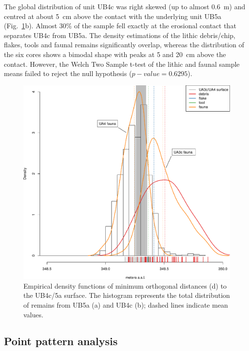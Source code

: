 \documentclass[preprint,authoryear,times]{elsarticle} %
\begin{document}
The global distribution of unit UB4c was right skewed (up to almost 0.6~m) and centred at about 5~cm above the contact with the underlying unit UB5a (Fig.~\ref{fig:8}b). Almost 30\% of the sample fell exactly at the erosional contact that separates UB4c from UB5a. The density estimations of the lithic debris/chip, flakes, tools and faunal remains significantly overlap, whereas the distribution of the six cores shows a bimodal shape with peaks at 5 and 20~cm above the contact. However, the Welch Two Sample t-test of the lithic and faunal sample means failed to reject the null hypothesis ($p-value=0.6295$). %

\begin{figure}[]
  \centering
  \includegraphics[width=1\textwidth]{../artwork/Fig8.pdf}
  \caption{Empirical density functions of minimum orthogonal distances (d) to the UB4c/5a surface. The histogram represents the total distribution of remains from UB5a (a) and UB4c (b); dashed lines indicate mean values.}
  \label{fig:8}
\end{figure}

\subsection{Point pattern analysis}
\end{document}

